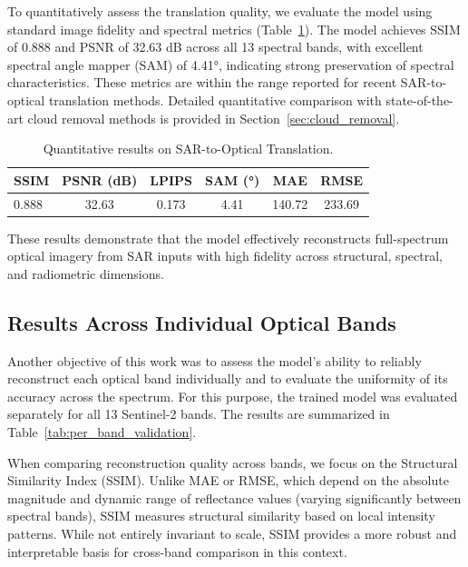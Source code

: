 \documentclass[remotesensing,article,submit,pdftex,moreauthors]{Definitions/mdpi}
\begin{document}
To quantitatively assess the translation quality, we evaluate the model using standard image fidelity and spectral metrics (Table~\ref{tab:quantitative_result_translation}). The model achieves SSIM of 0.888 and PSNR of 32.63 dB across all 13 spectral bands, with excellent spectral angle mapper (SAM) of 4.41°, indicating strong preservation of spectral characteristics. These metrics are within the range reported for recent SAR-to-optical translation methods. Detailed quantitative comparison with state-of-the-art cloud removal methods is provided in Section~\ref{sec:cloud_removal}. 


\begin{table}[!htbp]
    \centering
    \caption{Quantitative results on SAR-to-Optical Translation.}
    \begin{tabular}{lccccc}
        \toprule
        \textbf{SSIM} & \textbf{PSNR (dB)} & \textbf{LPIPS} & \textbf{SAM (°)} & \textbf{MAE} & \textbf{RMSE} \\
        \midrule
        0.888           & 32.63                & 0.173              & 4.41                 & 140.72           & 233.69            \\
        \bottomrule
    \end{tabular}
    \label{tab:quantitative_result_translation}
\end{table}


These results demonstrate that the model effectively reconstructs full-spectrum optical imagery from SAR inputs with high fidelity across structural, spectral, and radiometric dimensions.

\subsection{Results Across Individual Optical Bands}
Another objective of this work was to assess the model’s ability to reliably reconstruct each optical band individually and to evaluate the uniformity of its accuracy across the spectrum. For this purpose, the trained model was evaluated separately for all 13 Sentinel-2 bands. The results are summarized in Table~\ref{tab:per_band_validation}.

When comparing reconstruction quality across bands, we focus on the Structural Similarity Index (SSIM). Unlike MAE or RMSE, which depend on the absolute magnitude and dynamic range of reflectance values (varying significantly between spectral bands), SSIM measures structural similarity based on local intensity patterns. While not entirely invariant to scale, SSIM provides a more robust and interpretable basis for cross-band comparison in this context.
\end{document}
